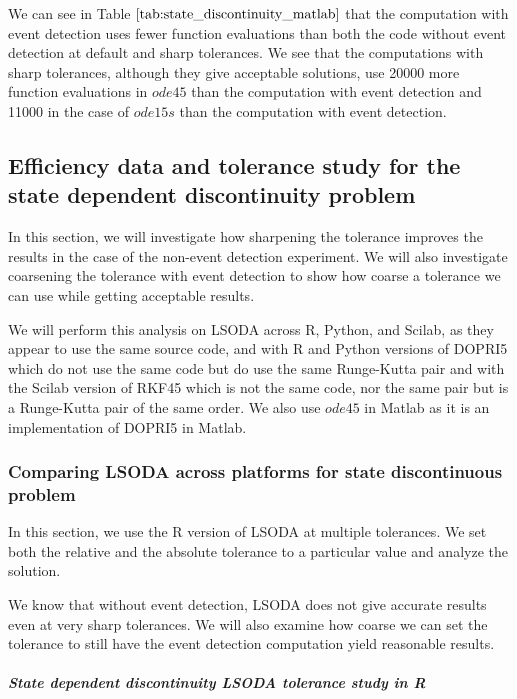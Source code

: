 We can see in Table $\ref{tab:state_discontinuity_matlab}$ that the computation with event detection uses fewer function evaluations than both the code without event detection at default and sharp tolerances. We see that the computations with sharp tolerances, although they give acceptable solutions, use 20000 more function evaluations in $ode45$ than the computation with event detection and 11000 in the case of $ode15s$ than the computation with event detection.

\subsection{Efficiency data and tolerance study for the state dependent discontinuity problem}
\label{subsection:state_tolerance_study}
In this section, we will investigate how sharpening the tolerance improves the results in the case of the non-event detection experiment. We will also investigate coarsening the tolerance with event detection to show how coarse a tolerance we can use while getting acceptable results.

We will perform this analysis on LSODA across R, Python, and Scilab, as they appear to use the same source code, and with R and Python versions of DOPRI5 which do not use the same code but do use the same Runge-Kutta pair and with the Scilab version of RKF45 which is not the same code, nor the same pair but is a Runge-Kutta pair of the same order. We also use $ode45$ in Matlab as it is an implementation of DOPRI5 in Matlab. 

\subsubsection{Comparing LSODA across platforms for state discontinuous problem}
In this section, we use the R version of LSODA at multiple tolerances. We set both the relative and the absolute tolerance to a particular value and analyze the solution.

We know that without event detection, LSODA does not give accurate results even at very sharp tolerances. We will also examine how coarse we can set the tolerance to still have the event detection computation yield reasonable results.

\subparagraph{State dependent discontinuity LSODA tolerance study in R}

